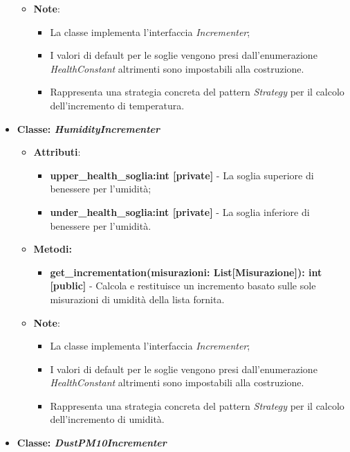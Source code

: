 \begin{itemize}
\begin{itemize}
\begin{itemize}
    \end{itemize}
    \item\textbf{Note}:
        \begin{itemize}
            \item La classe implementa l'interfaccia \textit{Incrementer};
            \item I valori di default per le soglie vengono presi dall'enumerazione \textit{HealthConstant} altrimenti sono impostabili alla costruzione.
            \item Rappresenta una strategia concreta del pattern \textit{Strategy} per il calcolo dell'incremento di temperatura.
        \end{itemize}
    \end{itemize}
    \item{\textbf{Classe: \textit{HumidityIncrementer}}}
    \begin{itemize}
    \item\textbf{Attributi}:
        \begin{itemize}
        \item \textbf{upper\_health\_soglia:int [private]} - La soglia superiore di benessere per l'umidità;
        \item \textbf{under\_health\_soglia:int [private]} - La soglia inferiore di benessere per l'umidità.
    \end{itemize}
    \item \textbf{Metodi: }
    \begin{itemize}
        \item \textbf{get\_incrementation(misurazioni: List[Misurazione]): int [public]} - Calcola e restituisce un incremento basato sulle sole misurazioni di umidità della lista fornita.
    \end{itemize}
    \item\textbf{Note}:
        \begin{itemize}
            \item La classe implementa l'interfaccia \textit{Incrementer};
            \item I valori di default per le soglie vengono presi dall'enumerazione \textit{HealthConstant} altrimenti sono impostabili alla costruzione.
            \item Rappresenta una strategia concreta del pattern \textit{Strategy} per il calcolo dell'incremento di umidità.
        \end{itemize}
    \end{itemize}\item{\textbf{Classe: \textit{DustPM10Incrementer}}}

\end{itemize}
